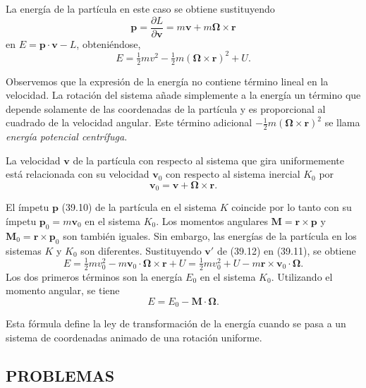\documentclass[12pt]{article}
\begin{document}
La energía de la partícula en este caso se obtiene sustituyendo
\[
\mathbf{p} = \frac{\partial L}{\partial \mathbf{v}} = m \mathbf{v} + m \mathbf{\Omega} \times \mathbf{r}
\]
en $E = \mathbf{p} \cdot \mathbf{v} - L$, obteniéndose,
\begin{equation}
E = \tfrac{1}{2} m v^2 - \tfrac{1}{2} m (\mathbf{\Omega} \times \mathbf{r})^2 + U.
\tag{39.11}
\end{equation}

Observemos que la expresión de la energía no contiene término lineal en la velocidad. La rotación del sistema añade simplemente a la energía un término que depende solamente de las coordenadas de la partícula y es proporcional al cuadrado de la velocidad angular. Este término adicional $-\tfrac{1}{2} m (\mathbf{\Omega} \times \mathbf{r})^2$ se llama \textit{energía potencial centrífuga}.

La velocidad $\mathbf{v}$ de la partícula con respecto al sistema que gira uniformemente está relacionada con su velocidad $\mathbf{v}_0$ con respecto al sistema inercial $K_0$ por
\begin{equation}
\mathbf{v}_0 = \mathbf{v} + \mathbf{\Omega} \times \mathbf{r}.
\tag{39.12}
\end{equation}

El ímpetu $\mathbf{p}$ (39.10) de la partícula en el sistema $K$ coincide por lo tanto con su ímpetu $\mathbf{p}_0 = m \mathbf{v}_0$ en el sistema $K_0$. Los momentos angulares $\mathbf{M} = \mathbf{r} \times \mathbf{p}$ y $\mathbf{M}_0 = \mathbf{r} \times \mathbf{p}_0$ son también iguales. Sin embargo, las energías de la partícula en los sistemas $K$ y $K_0$ son diferentes. Sustituyendo $\mathbf{v'}$ de (39.12) en (39.11), se obtiene
\[
E = \tfrac{1}{2} m v_0^2 - m \mathbf{v}_0 \cdot \mathbf{\Omega} \times \mathbf{r} + U = \tfrac{1}{2} m v_0^2 + U - m \mathbf{r} \times \mathbf{v}_0 \cdot \mathbf{\Omega}.
\]
Los dos primeros términos son la energía $E_0$ en el sistema $K_0$. Utilizando el momento angular, se tiene
\begin{equation}
E = E_0 - \mathbf{M} \cdot \mathbf{\Omega}.
\tag{39.13}
\end{equation}

Esta fórmula define la ley de transformación de la energía cuando se pasa a un sistema de coordenadas animado de una rotación uniforme.

\subsection*{PROBLEMAS}
\end{document}
